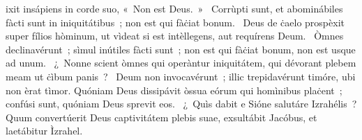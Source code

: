 { }
{%
ixit insápiens in corde suo, «~Non est Deus.~»
~Corrùpti sunt, et abominábiles fàcti sunt in iniquitátibus~; non est qui fàċiat bonum. 
~Deus de ċaelo prospèxit super fílios hòminum, ut vìdeat si est intèllegens, aut requírens Deum. 
~Òmnes declinavérunt~; sìmul inútiles fàcti sunt~; non est qui fàċiat bonum, non est usque ad unum. 
~¿~Nonne scient òmnes qui operàntur iniquitátem, qui dévorant plebem meam ut ċìbum panis~? 
~Deum non invocavérunt~; illic trepidavérunt timóre, ubi non èrat tìmor. Quóniam Deus dissipávit òssua eórum qui homìnibus plaċent~; confúsi sunt, quóniam Deus sprevit eos. 
~¿~Quìs dabit e Sióne salutáre Izrahélis~? Quum convertúerit Deus captivitátem plebis suae, exsultábit Jacóbus, et laetábitur Ìzrahel. 
}
